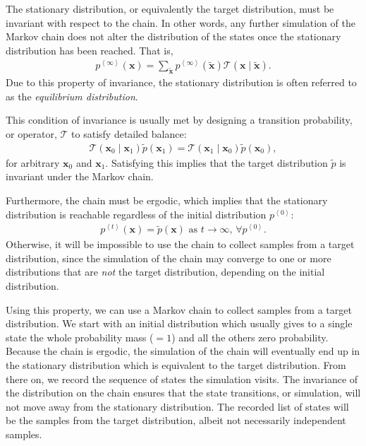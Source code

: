 \documentclass{now}
\newcommand{\qt}[1]{\left<#1\right>}
\newcommand{\vect}[1]{\mathbf{#1}}
\newcommand{\vx}[0]{\vect{x}}
\newcommand{\T}[0]{\mathcal{T}}
\begin{document}
The stationary distribution, or equivalently the target
distribution, must be invariant with respect to the chain.
In other words, any further simulation of the Markov chain
does not alter the distribution of the states once the
stationary distribution has been reached. That is,
\begin{align*}
    p^{\qt{\infty}}(\vx) = \sum_{\tilde{\vx}}
    p^{\qt{\infty}}(\tilde{\vx}) \T(\vx \mid \tilde{\vx}).
\end{align*}
Due to this property of invariance, the stationary
distribution is often referred to as the \textit{equilibrium
distribution}.

This condition of invariance is usually met by designing a
transition probability, or operator, $\T$ to satisfy 
detailed balance:
\begin{align*}
    \T(\vx_0 \mid \vx_1)\tilde{p}(\vx_1) = \T(\vx_1 \mid
    \vx_0)\tilde{p}(\vx_0),
\end{align*}
for arbitrary $\vx_{0}$ and $\vx_{1}$.  Satisfying this
implies that the target distribution $\tilde{p}$ is
invariant under the Markov chain.

Furthermore, the chain must be ergodic, which implies that
the stationary distribution is reachable
regardless of the initial distribution $p^{\qt{0}}$:
\begin{align}
    \label{eq:mcmc_ergodic}
    p^{\qt{t}}(\vx) = \tilde{p}(\vx)\text{ as }t \to
    \infty\text{, }\forall p^{\qt{0}}.
\end{align}
Otherwise, it will be impossible to use the chain to
collect samples from a target distribution, since the
simulation of the chain may converge to one or more
distributions that are \textit{not} the target distribution,
depending on the initial distribution.

Using this property, we can use a Markov chain to collect
samples from a target distribution. We start with an initial
distribution which usually gives to a single state the whole
probability mass ($=1$) and all the others zero probability. Because the
chain is ergodic, the simulation of the chain will
eventually end up in the stationary distribution which is
equivalent to the target distribution. From there on, we
record the sequence of states the simulation visits. The
invariance of the distribution on the chain ensures that the
state transitions, or simulation, will not move away from
the stationary distribution. The recorded list of states
will be the samples from the target distribution, albeit not
necessarily independent samples.
\end{document}
